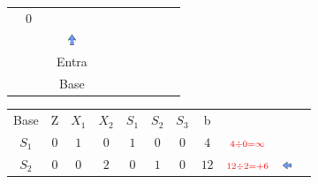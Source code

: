 \begin{frame}
{\begin{table}
\begin{tabular}{c c c c c c c c c c c}
				& \cellcolor{gray!50} $\scriptstyle 0$ 
				&
				&
				& \\
				\cline{1-8} 
				& 
				& 
				& \includegraphics[width=0.3cm,height=0.3cm]{setacima.jpg}
				& 
				& 
				& 
				&  
				&
				&
				& \\ 
				& 
				& 
				& \scriptsize \color{red} Entra 
				& 
				& 
				& 
				&  
				&
				&
				& \\
				& 
				& 
				& \scriptsize \color{red} Base 
				& 
				& 
				& 
				&  
				&
				&
				& \\

			\end{tabular}
		\end{table}			
	}	
	{		
		\begin{table}		
			\begin{tabular}{c c c c c c c c c c c}
				\cline{1-8} 
				\cellcolor{blue!100} \color{white} \scriptsize Base 
				&\cellcolor{blue!100} \color{white} \scriptsize Z 
				&\cellcolor{blue!100} \color{white} $\scriptstyle X_1$ 
				&\cellcolor{blue!100} \color{white} $\scriptstyle X_2$ 
				&\cellcolor{blue!100} \color{red} $\scriptstyle S_1$ 
				&\cellcolor{blue!100} \color{red} $\scriptstyle S_2$ 
				&\cellcolor{blue!100} \color{red} $\scriptstyle S_3$ 
				&\cellcolor{blue!100} \color{white} \scriptsize b
				&
				&
				& \\
				\cline{1-8}
				\cellcolor{blue!100} \color{red} $\scriptstyle S_1$
				& \cellcolor{yellow!50} $\scriptstyle 0$
				& \cellcolor{yellow!50} $\scriptstyle 1$
				& \cellcolor{gray!50} $\scriptstyle 0$
				& \cellcolor{yellow!50} $\scriptstyle 1$
				& \cellcolor{yellow!50} $\scriptstyle 0$
				& \cellcolor{yellow!50} $\scriptstyle 0$
				& \cellcolor{gray!50} $\scriptstyle 4$
				& $ \scriptstyle \color{red} 4 \div 0 = \infty $
				&
				& \\
				\cline{1-8} 
				\cellcolor{blue!100} \color{red} $\scriptstyle S_2$
				& \cellcolor{yellow!50} $\scriptstyle 0$
				& \cellcolor{yellow!50} $\scriptstyle 0$
				& \cellcolor{gray!50} $\scriptstyle 2$
				& \cellcolor{yellow!50} $\scriptstyle 0$			
				& \cellcolor{yellow!50} $\scriptstyle 1$
				& \cellcolor{yellow!50} $\scriptstyle 0$
				& \cellcolor{gray!50} $\scriptstyle 12$
				& $ \scriptstyle \color{red} 12 \div 2 = +6 $
				& \includegraphics[width=0.3cm,height=0.2cm]{setaesquerda.jpg}

\end{tabular}
\end{table}}
\end{frame}
